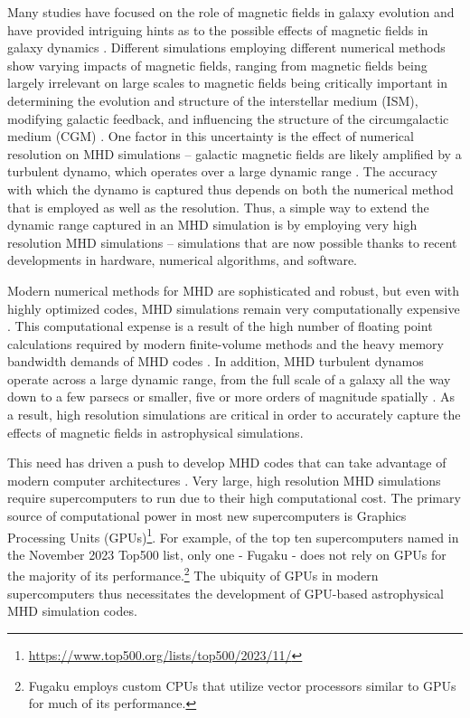 \documentclass[modern, linenumbers]{aastex631}
\begin{document}
Many studies have focused on the role of magnetic fields in galaxy evolution and have provided intriguing hints as to the possible effects of magnetic fields in galaxy dynamics \citep{shin_2008, banda_2016, grand_auriga_2017, pakmor_magnetic_2017, hopkins_but_2020, wibking_2021}. Different simulations employing different numerical methods show varying impacts of magnetic fields, ranging from magnetic fields being largely irrelevant on large scales to magnetic fields being critically important in determining the evolution and structure of the interstellar medium (ISM), modifying galactic feedback, and influencing the structure of the circumgalactic medium (CGM) \citep{martin-alvarez_how_2020, dobbs_magnetic_2007, kim_vertical_2015, hanasz_global_2009, pakmor_simulations_2013, banda_2017}. One factor in this uncertainty is the effect of numerical resolution on MHD simulations -- galactic magnetic fields are likely amplified by a turbulent dynamo, which operates over a large dynamic range \citep{martin-alvarez_three-phase_2018, beck_1996, gent_2021, carteret_2022, brandenburg_2023}. The accuracy with which the dynamo is captured thus depends on both the numerical method that is employed as well as the resolution. Thus, a simple way to extend the dynamic range captured in an MHD simulation is by employing very high resolution MHD simulations -- simulations that are now possible thanks to recent developments in hardware, numerical algorithms, and software.

Modern numerical methods for MHD are sophisticated and robust, but even with highly optimized codes, MHD simulations remain very computationally expensive \citep{athena++_2020}. This computational expense is a result of the high number of floating point calculations required by modern finite-volume methods and the heavy memory bandwidth demands of MHD codes \citep{k_athena_2021}. In addition, MHD turbulent dynamos operate across a large dynamic range, from the full scale of a galaxy all the way down to a few parsecs or smaller, five or more orders of magnitude spatially \citep{pariev_magnetic_1_2007, pariev_magnetic_2_2007, ntormousi_dynamo_2020, galishnikova_tearing_2022}. As a result, high resolution simulations are critical in order to accurately capture the effects of magnetic fields in astrophysical simulations. 

This need has driven a push to develop MHD codes that can take advantage of modern computer architectures \citep[e.g.][]{schive_gamer-2_2018, almgren_castro_2020, zingale_castro_2020, shankar_gram-x_2022, liska_h-amr_2022, begue_cuharm_2023, holmen_early_2023, parthenon_2023}. Very large, high resolution MHD simulations require supercomputers to run due to their high computational cost. The primary source of computational power in most new supercomputers is Graphics Processing Units (GPUs)\footnote{\url{https://www.top500.org/lists/top500/2023/11/}}. For example, of the top ten supercomputers named in the November 2023 Top500 list, only one - Fugaku - does not rely on GPUs for the majority of its performance.\footnote{Fugaku employs custom CPUs that utilize vector processors similar to GPUs for much of its performance.} The ubiquity of GPUs in modern supercomputers thus necessitates the development of GPU-based astrophysical MHD simulation codes.
\end{document}
